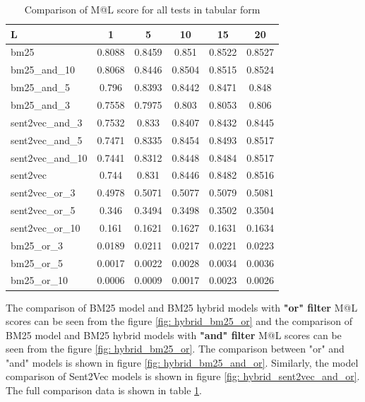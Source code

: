 \documentclass[10pt,a4paper,fleqn]{report}
\begin{document}
				\begin{table}[htbp]
					\centering
					\begin{tabular}{lccccc}
						\toprule
						L     & 1     & 5     & 10    & 15    & 20 \\
						\midrule
						bm25  & 0.8088 & 0.8459 & 0.851 & 0.8522 & 0.8527 \\
						bm25\_and\_10 & 0.8068 & 0.8446 & 0.8504 & 0.8515 & 0.8524 \\
						bm25\_and\_5 & 0.796 & 0.8393 & 0.8442 & 0.8471 & 0.848 \\
						bm25\_and\_3 & 0.7558 & 0.7975 & 0.803 & 0.8053 & 0.806 \\
						sent2vec\_and\_3 & 0.7532 & 0.833 & 0.8407 & 0.8432 & 0.8445 \\
						sent2vec\_and\_5 & 0.7471 & 0.8335 & 0.8454 & 0.8493 & 0.8517 \\
						sent2vec\_and\_10 & 0.7441 & 0.8312 & 0.8448 & 0.8484 & 0.8517 \\
						sent2vec & 0.744 & 0.831 & 0.8446 & 0.8482 & 0.8516 \\
						sent2vec\_or\_3 & 0.4978 & 0.5071 & 0.5077 & 0.5079 & 0.5081 \\
						sent2vec\_or\_5 & 0.346 & 0.3494 & 0.3498 & 0.3502 & 0.3504 \\
						sent2vec\_or\_10 & 0.161 & 0.1621 & 0.1627 & 0.1631 & 0.1634 \\
						bm25\_or\_3 & 0.0189 & 0.0211 & 0.0217 & 0.0221 & 0.0223 \\
						bm25\_or\_5 & 0.0017 & 0.0022 & 0.0028 & 0.0034 & 0.0036 \\
						bm25\_or\_10 & 0.0006 & 0.0009 & 0.0017 & 0.0023 & 0.0026 \\
						\bottomrule
					\end{tabular}%
					\caption{Comparison of M@L score for all tests in tabular form}
					\label{tab: comparison of ml scores of all models}%
				\end{table}%
				
				
				The comparison of BM25 model and BM25 hybrid models with \textbf{"or" filter} M@L scores can be seen from the figure \ref{fig: hybrid_bm25_or} and the comparison of BM25 model and BM25 hybrid models with \textbf{"and" filter} M@L scores can be seen from the figure \ref{fig: hybrid_bm25_or}.
				The comparison between "or" and "and" models is shown in figure \ref{fig: hybrid_bm25_and_or}.
				Similarly, the model comparison of Sent2Vec models is shown in figure \ref{fig: hybrid_sent2vec_and_or}.			
				The full comparison data is shown in table \ref{tab: comparison of ml scores of all models}.
				
\end{document}

